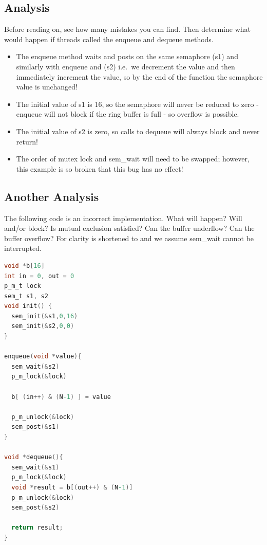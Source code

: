 \subsection{Analysis}

Before reading on, see how many mistakes you can find. Then determine what would happen if threads called the enqueue and dequeue methods.

\begin{itemize}
\tightlist
\item
  The enqueue method waits and posts on the same semaphore (s1) and similarly with enqueue and (s2) i.e.~we decrement the value and then immediately increment the value, so by the end of the function the semaphore value is unchanged!
\item
  The initial value of s1 is 16, so the semaphore will never be reduced to zero - enqueue will not block if the ring buffer is full - so overflow is possible.
\item
  The initial value of s2 is zero, so calls to dequeue will always block and never return!
\item
  The order of mutex lock and sem\_wait will need to be swapped; however, this example is so broken that this bug has no effect!
\end{itemize}

\subsection{Another Analysis}

The following code is an incorrect implementation.
What will happen?
Will  and/or  block?
Is mutual exclusion satisfied?
Can the buffer underflow?
Can the buffer overflow?
For clarity  is shortened to  and we assume sem\_wait cannot be interrupted.

\begin{lstlisting}[language=C]
void *b[16]
int in = 0, out = 0
p_m_t lock
sem_t s1, s2
void init() {
  sem_init(&s1,0,16)
  sem_init(&s2,0,0)
}

enqueue(void *value){
  sem_wait(&s2)
  p_m_lock(&lock)

  b[ (in++) & (N-1) ] = value

  p_m_unlock(&lock)
  sem_post(&s1)
}

void *dequeue(){
  sem_wait(&s1)
  p_m_lock(&lock)
  void *result = b[(out++) & (N-1)]
  p_m_unlock(&lock)
  sem_post(&s2)

  return result;
}
\end{lstlisting}

